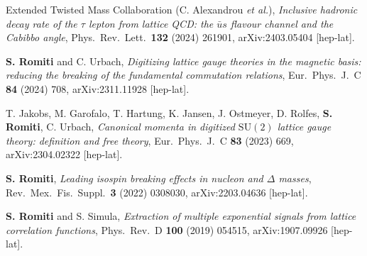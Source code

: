 \begin{enumerate}[leftmargin=1.6em,labelsep=0.5em,label={[J\arabic*]},itemsep=2pt,topsep=3pt]
  \item Extended Twisted Mass Collaboration (C. Alexandrou \textit{et al.}), \textit{Inclusive hadronic decay
  rate of the $\tau$ lepton from lattice QCD: the $\bar{u}s$ flavour channel and the Cabibbo angle}, Phys.\ Rev.\
  Lett.\ \textbf{132} (2024) 261901, arXiv:2403.05404 [hep-lat].

  \item \label{pub:digitization} \textbf{S. Romiti} and C. Urbach, \textit{Digitizing lattice gauge theories in the magnetic basis:
  reducing the breaking of the fundamental commutation relations}, Eur.\ Phys.\ J.\ C \textbf{84} (2024) 708,
  arXiv:2311.11928 [hep-lat].

  \item \label{pub:canonicalmomenta} T. Jakobs, M. Garofalo, T. Hartung, K. Jansen, J. Ostmeyer, D. Rolfes, \textbf{S. Romiti}, C. Urbach,
  \textit{Canonical momenta in digitized $\mathrm{SU}(2)$ lattice gauge theory: definition and free theory},
  Eur.\ Phys.\ J.\ C \textbf{83} (2023) 669, arXiv:2304.02322 [hep-lat].

  \item \label{pub:isospin} \textbf{S. Romiti}, \textit{Leading isospin breaking effects in nucleon and $\Delta$ masses},
  Rev.\ Mex.\ Fis.\ Suppl.\ \textbf{3} (2022) 0308030, arXiv:2203.04636 [hep-lat].

  \item \label{pub:extraction} \textbf{S. Romiti} and S. Simula, \textit{Extraction of multiple exponential signals from lattice
  correlation functions}, Phys.\ Rev.\ D \textbf{100} (2019) 054515, arXiv:1907.09926 [hep-lat].
\end{enumerate}


